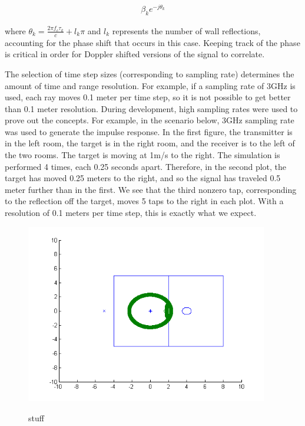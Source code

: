 \documentclass[article,11pt,onecolumn,final]{IEEEtran}
\begin{document}
\begin{align*}
\beta_{k} e^{-j \theta_k}
\end{align*}

where $\theta_k=\frac{2 \pi f_c \tau_k}{c} + l_k \pi$
and $l_k$ represents the number of wall reflections, accounting for the phase shift that occurs in this case. Keeping track of the phase is critical in order for Doppler shifted versions of the signal to correlate.

The selection of time step sizes (corresponding to sampling rate) determines the amount of time and range resolution. For example, if a sampling rate of 3GHz is used, each ray moves 0.1 meter per time step, so it is not possible to get better than 0.1 meter resolution. During development, high sampling rates were used to prove out the concepts. For example, in the scenario below, 3GHz sampling rate was used to generate the impulse response. In the first figure, the transmitter is in the left room, the target is in the right room, and the receiver is to the left of the two rooms. The target is moving at 1m/s to the right. The simulation is performed 4 times, each 0.25 seconds apart. Therefore, in the second plot, the target has moved 0.25 meters to the right, and so the signal has traveled 0.5 meter further than in the first. We see that the third nonzero tap, corresponding to the reflection off the target, moves 5 taps to the right in each plot. With a resolution of 0.1 meters per time step, this is exactly what we expect.

\begin{figure}
\caption{stuff}
\centering
\includegraphics[width=400px]{sim/simulation.png}  
\label{fig:stuff}
\end{figure}
\end{document}
